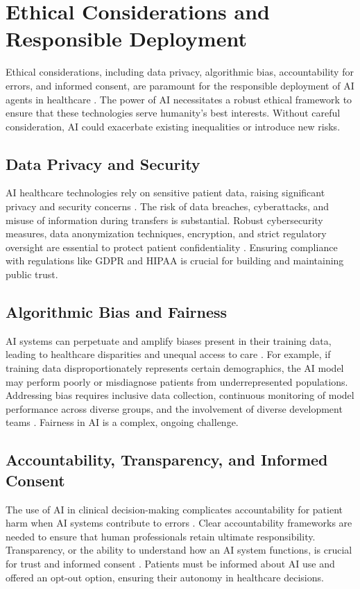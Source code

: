 \documentclass[12pt,a4paper]{article}
\begin{document}
\section{Ethical Considerations and Responsible Deployment}
Ethical considerations, including data privacy, algorithmic bias, accountability for errors, and informed consent, are paramount for the responsible deployment of AI agents in healthcare \cite{nih_ethical_implications}. The power of AI necessitates a robust ethical framework to ensure that these technologies serve humanity's best interests. Without careful consideration, AI could exacerbate existing inequalities or introduce new risks.

\subsection{Data Privacy and Security}
AI healthcare technologies rely on sensitive patient data, raising significant privacy and security concerns \cite{nih_ethical_implications}. The risk of data breaches, cyberattacks, and misuse of information during transfers is substantial. Robust cybersecurity measures, data anonymization techniques, encryption, and strict regulatory oversight are essential to protect patient confidentiality \cite{oracle_cloud}. Ensuring compliance with regulations like GDPR and HIPAA is crucial for building and maintaining public trust.

\subsection{Algorithmic Bias and Fairness}
AI systems can perpetuate and amplify biases present in their training data, leading to healthcare disparities and unequal access to care \cite{nih_ethical_implications}. For example, if training data disproportionately represents certain demographics, the AI model may perform poorly or misdiagnose patients from underrepresented populations. Addressing bias requires inclusive data collection, continuous monitoring of model performance across diverse groups, and the involvement of diverse development teams \cite{pew}. Fairness in AI is a complex, ongoing challenge.

\subsection{Accountability, Transparency, and Informed Consent}
The use of AI in clinical decision-making complicates accountability for patient harm when AI systems contribute to errors \cite{nih_ethical_implications}. Clear accountability frameworks are needed to ensure that human professionals retain ultimate responsibility. Transparency, or the ability to understand how an AI system functions, is crucial for trust and informed consent \cite{nih_ethical_implications}. Patients must be informed about AI use and offered an opt-out option, ensuring their autonomy in healthcare decisions.
\end{document}
